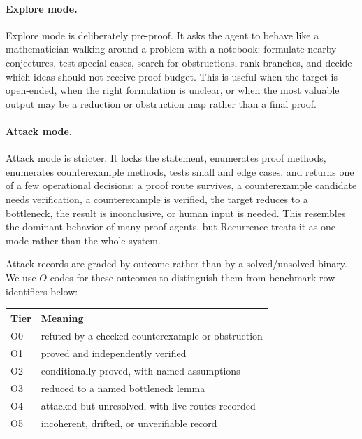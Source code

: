 \documentclass{article}
\theoremstyle{definition}
\theoremstyle{remark}
\begin{document}
\paragraph{Explore mode.}
Explore mode is deliberately pre-proof. It asks the agent to behave like a mathematician walking around a problem with a notebook: formulate nearby conjectures, test special cases, search for obstructions, rank branches, and decide which ideas should not receive proof budget. This is useful when the target is open-ended, when the right formulation is unclear, or when the most valuable output may be a reduction or obstruction map rather than a final proof.

\paragraph{Attack mode.}
Attack mode is stricter. It locks the statement, enumerates proof methods, enumerates counterexample methods, tests small and edge cases, and returns one of a few operational decisions: a proof route survives, a counterexample candidate needs verification, a counterexample is verified, the target reduces to a bottleneck, the result is inconclusive, or human input is needed. This resembles the dominant behavior of many proof agents, but Recurrence treats it as one mode rather than the whole system.

Attack records are graded by outcome rather than by a solved/unsolved binary. We use \(O\)-codes for these outcomes to distinguish them from benchmark row identifiers below:
\begin{center}
\begin{footnotesize}
\begin{tabular}{lp{}}
\toprule
Tier & Meaning \\
\midrule
O0 & refuted by a checked counterexample or obstruction \\
O1 & proved and independently verified \\
O2 & conditionally proved, with named assumptions \\
O3 & reduced to a named bottleneck lemma \\
O4 & attacked but unresolved, with live routes recorded \\
O5 & incoherent, drifted, or unverifiable record \\
\bottomrule
\end{tabular}
\end{footnotesize}
\end{center}
\end{document}
